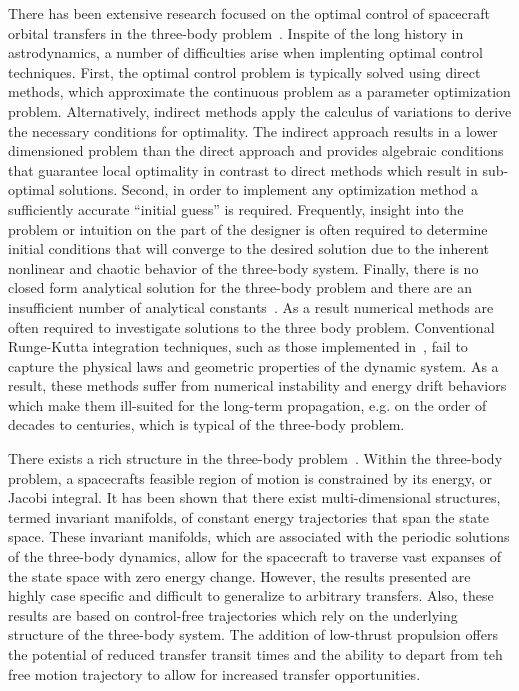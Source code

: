 \documentclass[smallcondensed]{svjour3}
\begin{document}


There has been extensive research focused on the optimal control of spacecraft orbital transfers in the three-body problem~\cite{mingotti2011,grebow2011}. 
Inspite of the long history in astrodynamics, a number of difficulties arise when implenting optimal control techniques.
First, the optimal control problem is typically solved using direct methods, which approximate the continuous problem as a parameter optimization problem.
Alternatively, indirect methods apply the calculus of variations to derive the necessary conditions for optimality.
The indirect approach results in a lower dimensioned problem than the direct approach and provides algebraic conditions that guarantee local optimality in contrast to direct methods which result in sub-optimal solutions.
Second, in order to implement any optimization method a sufficiently accurate ``initial guess'' is required.
Frequently, insight into the problem or intuition on the part of the designer is often required to determine initial conditions that will converge to the desired solution due to the inherent nonlinear and chaotic behavior of the three-body system.
Finally, there is no closed form analytical solution for the three-body problem and there are an insufficient number of analytical constants~\cite{szebehely1967}.
As a result numerical methods are often required to investigate solutions to the three body problem.
Conventional Runge-Kutta integration techniques, such as those implemented in~\cite{mingotti2011,grebow2011}, fail to capture the physical laws and geometric properties of the dynamic system.
As a result, these methods suffer from numerical instability and energy drift behaviors which make them ill-suited for the long-term propagation, e.g. on the order of decades to centuries, which is typical of the three-body problem. 

There exists a rich structure in the three-body problem~\cite{koon2011,ross2006}.
Within the three-body problem, a spacecrafts feasible region of motion is constrained by its energy, or Jacobi integral.
It has been shown that there exist multi-dimensional structures, termed invariant manifolds, of constant energy trajectories that span the state space. 
These invariant manifolds, which are associated with the periodic solutions of the three-body dynamics, allow for the spacecraft to traverse vast expanses of the state space with zero energy change. 
However, the results presented are highly case specific and difficult to generalize to arbitrary transfers.
Also, these results are based on control-free trajectories which rely on the underlying structure of the three-body system. 
The addition of low-thrust propulsion offers the potential of reduced transfer transit times and the ability to depart from teh free motion trajectory to allow for increased transfer opportunities.
\end{document}
